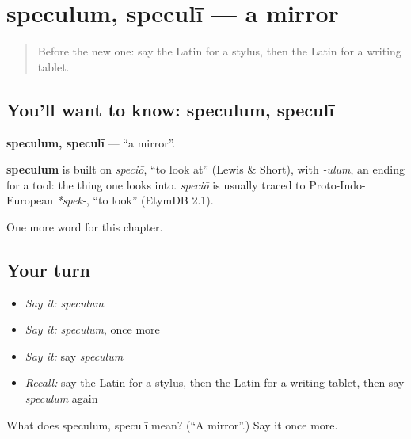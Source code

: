 \section[speculum, speculī]{speculum, speculī — a mirror}

\label{lesson:LA-C84-speculum}



\begin{quote}
Before the new one: say the Latin for a stylus, then the Latin for a writing tablet.
\end{quote}

\subsection*{You'll want to know: speculum, speculī}
\textbf{speculum, speculī} — \textquotedblleft{}a mirror\textquotedblright{}.

\begin{cousinweb}
\textbf{speculum} is built on \emph{speciō}, \textquotedblleft{}to look at\textquotedblright{} (Lewis \& Short), with \emph{-ulum}, an ending for a tool: the thing one looks into. \emph{speciō} is usually traced to Proto-Indo-European \emph{*spek-}, \textquotedblleft{}to look\textquotedblright{} (EtymDB 2.1).
\end{cousinweb}

\begin{grammarlens}[title={What you've built}]
One more word for this chapter.
\end{grammarlens}

\subsection*{Your turn}
\begin{itemize}
\raggedright
  \item \emph{Say it:} \emph{speculum}
  \item \emph{Say it:} \emph{speculum}, once more
  \item \emph{Say it:} say \emph{speculum}
  \item \emph{Recall:} say the Latin for a stylus, then the Latin for a writing tablet, then say \emph{speculum} again
\end{itemize}

\begin{tcolorbox}[breakable,colback=teal!4,colframe=teal!35!black,title={Before you move on}]
What does speculum, speculī mean? (\textquotedblleft{}A mirror\textquotedblright{}.) Say it once more.
\end{tcolorbox}
